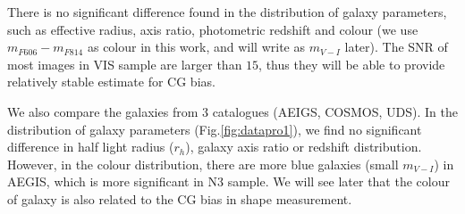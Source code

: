 \documentclass[useAMS,usenatbib]{mnras}
\begin{document}
There is no significant difference found in the distribution of galaxy
parameters, such as effective radius, axis ratio, photometric redshift
and colour (we use $m_{F606}-m_{F814}$ as colour in this work, and
will write as $m_{V-I}$ later). The SNR of most images in VIS sample
are larger than $15$, thus they will be able to provide relatively
stable estimate for CG bias.

We also compare the galaxies from 3 catalogues (AEIGS, COSMOS, UDS).  In
the distribution of galaxy parameters (Fig.\ref{fig:datapro1}), we
find no significant difference in half light radius ($r_h$), galaxy
axis ratio or redshift distribution. However, in the colour
distribution, there are more blue galaxies (small $m_{V-I}$) in AEGIS,
which is more significant in N3 sample. We will see later that the
colour of galaxy is also related to the CG bias in shape measurement.
%
\end{document}

